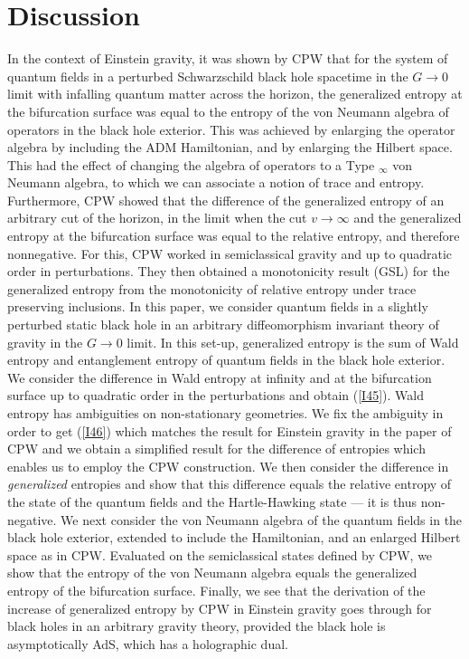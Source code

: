 \documentclass[12pt]{article}
\newcommand{\RomanNumeralCaps}[1]
    {\MakeUppercase{\romannumeral #1}}
\begin{document}
\section{Discussion}
In the context of Einstein gravity, it was shown by CPW \cite{VGE} that for the system of quantum fields in a perturbed Schwarzschild black hole spacetime in the $G \to 0$ limit with infalling quantum matter across the horizon, the generalized entropy at the bifurcation surface was equal to the entropy of the von Neumann algebra of operators in the black hole exterior. This was achieved by enlarging the operator algebra by including the ADM Hamiltonian, and by enlarging the Hilbert space. This had the effect of changing the algebra of operators to a Type \RomanNumeralCaps {2}$_\infty$ von Neumann algebra, to which we can associate a notion of trace and entropy. Furthermore, CPW showed that the difference of the generalized entropy of an arbitrary cut of the horizon, in the limit when the cut $v \to \infty$ and the generalized entropy at the bifurcation surface was equal to the relative entropy, and therefore nonnegative. For this, CPW worked in semiclassical gravity and up to quadratic order in perturbations. They then obtained a monotonicity result (GSL) for the generalized entropy from the monotonicity of relative entropy under trace preserving inclusions.
In this paper, we consider quantum fields in a slightly perturbed static black hole in an arbitrary diffeomorphism invariant theory of gravity in the $G \to 0$ limit. In this set-up, generalized entropy is the sum of Wald entropy and entanglement entropy of quantum fields in the black hole exterior.  We consider the difference in Wald entropy at infinity and at the bifurcation surface up to quadratic order in the perturbations and obtain (\ref{I45}). Wald entropy has ambiguities on non-stationary geometries. We fix the ambiguity in order to get (\ref{I46}) which matches the result for Einstein gravity in the paper of CPW and we obtain a simplified result for the difference of entropies which enables us to employ the CPW construction. We then consider the difference in \emph{generalized} entropies and show that this difference equals the relative entropy of the state of the quantum fields and the Hartle-Hawking state --- it is thus non-negative. We next consider the von Neumann algebra of the quantum fields in the black hole exterior, extended to include the Hamiltonian, and an enlarged Hilbert space as in CPW. Evaluated on the semiclassical states defined by CPW, we show that the entropy of the von Neumann algebra equals the generalized entropy of the bifurcation surface. Finally, we see that the derivation of the increase of generalized entropy by CPW in Einstein gravity goes through for black holes in an arbitrary gravity theory, provided the black hole is asymptotically AdS, which has a holographic dual.
\end{document}
